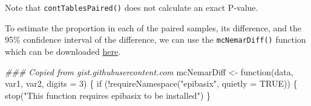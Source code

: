 \documentclass[
  a4paper,
]{memoir}
\newenvironment{Shaded}{\begin{snugshade}}{\end{snugshade}}
\newcommand{\AttributeTok}[1]{\textcolor[rgb]{0.00,0.00,0.00}{#1}}
\newcommand{\ConstantTok}[1]{\textcolor[rgb]{0.00,0.00,0.00}{#1}}
\newcommand{\ControlFlowTok}[1]{\textcolor[rgb]{0.00,0.00,0.00}{#1}}
\newcommand{\DecValTok}[1]{\textcolor[rgb]{0.00,0.00,0.00}{#1}}
\newcommand{\DocumentationTok}[1]{\textcolor[rgb]{0.00,0.00,0.00}{\textit{#1}}}
\newcommand{\FunctionTok}[1]{\textcolor[rgb]{0.00,0.00,0.00}{#1}}
\newcommand{\NormalTok}[1]{\textcolor[rgb]{0.00,0.00,0.00}{#1}}
\newcommand{\OtherTok}[1]{\textcolor[rgb]{0.00,0.00,0.00}{#1}}
\newcommand{\SpecialCharTok}[1]{\textcolor[rgb]{0.00,0.00,0.00}{#1}}
\newcommand{\StringTok}[1]{\textcolor[rgb]{0.00,0.00,0.00}{#1}}
\begin{document}
Note that \texttt{contTablesPaired()} does not calculate an exact
P-value.

To estimate the proportion in each of the paired samples, its
difference, and the 95\% confidence interval of the difference, we can
use the \texttt{mcNemarDiff()} function which can be downloaded
\href{https://gist.githubusercontent.com/timothydobbins/525d25271b04b2ea72aae70c4aac8b01/raw/6b69f5b229d50daeac4c2f4cf4331e88b0c65717/mcNemarDiff.R}{here}.

\begin{Shaded}
\begin{Highlighting}[]
\DocumentationTok{\#\#\# Copied from gist.githubusercontent.com}
\NormalTok{mcNemarDiff }\OtherTok{\textless{}{-}} \ControlFlowTok{function}\NormalTok{(data, var1, var2, }\AttributeTok{digits =} \DecValTok{3}\NormalTok{) \{}
    \ControlFlowTok{if}\NormalTok{ (}\SpecialCharTok{!}\FunctionTok{requireNamespace}\NormalTok{(}\StringTok{"epibasix"}\NormalTok{, }\AttributeTok{quietly =} \ConstantTok{TRUE}\NormalTok{)) \{}
        \FunctionTok{stop}\NormalTok{(}\StringTok{"This function requires epibasix to be installed"}\NormalTok{)}
\NormalTok{    \}}


\end{Highlighting}
\end{Shaded}
\end{document}
